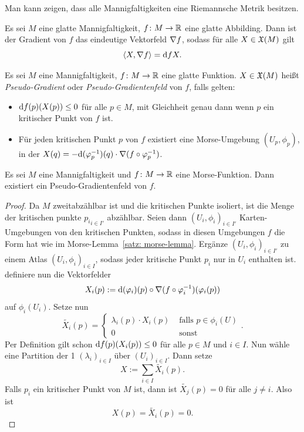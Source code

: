 \begin{remark}
    Man kann zeigen, dass alle Mannigfaltigkeiten eine Riemannsche Metrik besitzen.
\end{remark}

\begin{definition}[Gradient]
    \label{def: gradient}
    Es sei $M$ eine glatte Mannigfaltigkeit, $f \colon M \to { \mathbb R }$ eine glatte Abbilding. Dann 
    ist der Gradient von $f$ das eindeutige Vektorfeld ${ \nabla } f$, sodass für alle $X \in { \mathfrak{X} } (M)$
    gilt 
    \[ \langle X , { \nabla } f \rangle = { \operatorname{d} } f X . \]
\end{definition}

\begin{definition}
    \label{def: pseudo-gradient}
    Es sei $M$ eine Mannigfaltigkeit, $f \colon M \to { \mathbb R }$ eine glatte Funktion. $X \in { \mathfrak{X} } (M)$
    heißt \textit{Pseudo-Gradient} oder \textit{Pseudo-Gradientenfeld} von $f$, falls gelten:
    \begin{itemize}
        \item ${ \operatorname{d} } f (p) (X(p)) \leq 0$ für alle $p \in M$, mit Gleichheit genau dann wenn 
            $p$ ein kritischer Punkt von $f$ ist.
        \item Für jeden kritischen Punkt $p$ von $f$ existiert eine Morse-Umgebung 
            $(U_p, \phi_p)$, in der $X (q) = - { \operatorname{d} } (\varphi_p^{-1}) (q) \cdot { \nabla } (f \circ \varphi_p^{-1})$.
    \end{itemize}
\end{definition}

\begin{prop}
    Es sei $M$ eine Mannigfaltigkeit und $f \colon M \to { \mathbb R }$ eine Morse-Funktion. 
    Dann existiert ein Pseudo-Gradientenfeld von $f$.
\end{prop}

\begin{proof}
    Da $M$ zweitabzählbar ist und die kritischen Punkte isoliert, ist die Menge der kritischen
    punkte ${p_i}_{i \in I'}$ abzählbar. Seien dann ${(U_i, \phi_i)}_{i \in I'}$ Karten-Umgebungen
    von den kritischen Punkten, sodass in diesen Umgebungen $f$ die Form hat wie im 
    Morse-Lemma~\ref{satz: morse-lemma}. Ergänze ${(U_i, \phi_i)}_{i \in I'}$ zu einem Atlas 
    ${(U_i, \phi_i)}_{i \in I}$, sodass jeder kritische Punkt $p_i$ nur in $U_i$ enthalten ist.
    definiere nun die Vektorfelder
    \[ X_i (p) := { \operatorname{d} } (\varphi_i) (p) \circ { \nabla } (f \circ \varphi_i^{-1}) (\varphi_i(p)) \]
    auf $\phi_i(U_i)$. Setze nun
    \[ \tilde{X_i}(p) = \begin{cases}
        \lambda_i (p) \cdot X_i(p) & \text{ falls } p \in \phi_i(U) \\
        0 & \text{ sonst }
    \end{cases} . \]
    Per Definition gilt schon ${ \operatorname{d} } f (p) (X_i(p)) \leq 0$ für alle $p \in M$ und $i \in I$.
    Nun wähle eine Partition der 1 $(\lambda_i)_{i \in I}$ über $(U_i)_{i \in I}$. Dann setze
    \[ X := \sum_{i \in I} \tilde{X_i}(p) . \]
    Falls $p_i$ ein kritischer Punkt von $M$ ist, dann ist $\tilde{X_j}(p) = 0$ 
    für alle $j \neq i$. Also ist 
    \[ X(p) = \tilde{X_i}(p) = 0 . \]
\end{proof}

